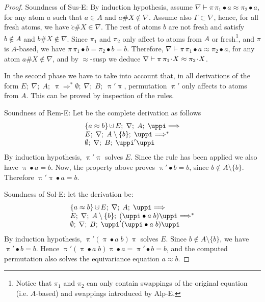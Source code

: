 \documentclass[11pt,a4paper]{amsart}
\theoremstyle{definition}
\newcommand{\Lra}{\Longrightarrow}
\newcommand{\perm}{\approx}
\newcommand{\permap}{{\mkern 1mu\cdot \mkern 1mu}}
\newcommand{\permef}{\bullet}
\newcommand\ppi{\uppi}
\newcommand{\dotcup}{\ensuremath{\mathop{\mathaccent\cdot\cup}}}
\newcommand{\mran}{A}
\newcommand{\mproblem}{E}
\newcommand{\mnabla}{\nabla}
\newcommand{\fresh}[1]{{\acute{#1}}}
\newcommand{\Atoms}{A}
\begin{document}
\begin{proof}
Soundness of {\sf Sus-E}:  By induction hypothesis, assume
$\nabla\vdash\pi\,\pi_1\permef a \approx \pi_2\permef a$, for any atom
$a$ such that $a\in\Atoms$ and $a\#X\not\in\nabla$.  Assume also
$\Gamma\subset\nabla$, hence, for all fresh atoms, we have
$\fresh{c}\#X\in\nabla$. The rest of atoms $b$ are not fresh and
satisfy $b\not\in\Atoms$ and $b\#X\not\in\nabla$. Since $\pi_1$ and
$\pi_2$ only affect to atoms from $A$ or fresh\footnote{Notice that
  $\pi_1$ and $\pi_2$ can only contain swappings of the original
  equation (i.e. $\Atoms$-based) and swappings introduced by {\sf
    Alp-E}.}, and $\pi$ is $\Atoms$-based, we have $\pi\,\pi_1\permef
b = \pi_2\permef b = b$.  Therefore, $\nabla\vdash\pi\,\pi_1\permef a
\approx \pi_2\permef a$, for any atom $a\#X\not\in\nabla$, and by
$\approx$-susp we deduce $\nabla\vdash \pi\,\pi_1\permap X \approx
\pi_2\permap X$.

In the second phase we have to take into account that, in all
derivations of the form $\mproblem ;\; \mnabla ;\; A ;\; \ppi \Lra^*
\emptyset;\; \mnabla ;\; B ;\;\ppi'\ppi$, permutation $\ppi'$ only
affects to atoms from $A$. This can be proved by inspection of the
rules.

Soundness of {\sf Rem-E}: Let be the complete derivation as follows
$$
\begin{array}{l}
\{a \perm b\} \dotcup \mproblem ;\; \mnabla ;\; \mran ;\;\ppi \Lra\\
\mproblem ;\; \mnabla ;\; \mran\setminus\{b\} ;\; \ppi \Lra^*\\
\emptyset;\; \mnabla ;\; B ;\;\ppi'\ppi
\end{array}
$$ 
By induction hypothesis, $\ppi'\ppi$ solves $\mproblem$.  Since the
rule has been applied we also have $\ppi\permef a = b$.  Now, the
property above proves $\ppi'\permef b = b$, since
$b\not\in\mran\setminus\{b\}$. Therefore $\ppi'\ppi\permef a = b$.

Soundness of {\sf Sol-E}: let the derivation be:
$$
\begin{array}{l}
\{a \perm b\} \dotcup \mproblem ;\; \mnabla ;\; \mran ;\;\ppi \Lra\\
\mproblem ;\; \mnabla ;\; \mran\setminus\{b\} ;\; (\ppi\permef a\; b)\ppi \Lra^*\\
\emptyset;\; \mnabla ;\; B ;\;\ppi'(\ppi\permef a\; b)\ppi
\end{array}
$$ By induction hypothesis, $\ppi'(\ppi\permef a\; b)\ppi$ solves
$\mproblem$. Since $b\not\in\mran\setminus\{b\}$, we have $\ppi'\permef b
= b$. Hence $\ppi'(\ppi\permef a\; b)\ppi \permef a = \ppi'\permef b =
b$, and the computed permutation also solves the equivariance equation
$a \perm b$.
\end{proof}
\end{document}
